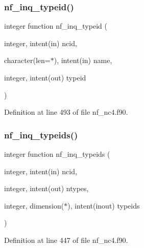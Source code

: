 \subsubsection{\texorpdfstring{nf\+\_\+inq\+\_\+typeid()}{nf\_inq\_typeid()}}
{\footnotesize\ttfamily integer function nf\+\_\+inq\+\_\+typeid (\begin{DoxyParamCaption}\item[{integer, intent(in)}]{ncid,  }\item[{character(len=$\ast$), intent(in)}]{name,  }\item[{integer, intent(out)}]{typeid }\end{DoxyParamCaption})}



Definition at line 493 of file nf\+\_\+nc4.\+f90.

\mbox{\label{nf__nc4_8f90_adcbd30e7ca8d10327a7bb52f7184972d}} 
\subsubsection{\texorpdfstring{nf\+\_\+inq\+\_\+typeids()}{nf\_inq\_typeids()}}
{\footnotesize\ttfamily integer function nf\+\_\+inq\+\_\+typeids (\begin{DoxyParamCaption}\item[{integer, intent(in)}]{ncid,  }\item[{integer, intent(out)}]{ntypes,  }\item[{integer, dimension($\ast$), intent(inout)}]{typeids }\end{DoxyParamCaption})}



Definition at line 447 of file nf\+\_\+nc4.\+f90.

\mbox{\label{nf__nc4_8f90_a667616f8f1c6cda00fdd52a4f2d186d3}} 
